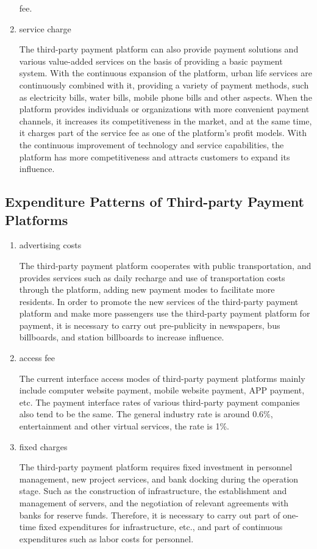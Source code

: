 \documentclass[../mcmpaper]{subfiles}
\begin{document}
\begin{enumerate}[label=\arabic*), itemindent=2\parindent, leftmargin=0pt, topsep=0pt, listparindent=\parindent, itemsep=1pt]
fee.
	\item service charge\par
The third-party payment platform can also provide payment solutions and various value-added services on the basis of providing a basic payment system. With the continuous expansion of the platform, urban life services are continuously combined with it, providing a variety of payment methods, such as electricity bills, water bills, mobile phone bills and other aspects. When the platform provides individuals or organizations with more convenient payment channels, it increases its competitiveness in the market, and at the same time, it charges part of the service fee as one of the platform's profit models. With the continuous improvement of technology and service capabilities, the platform has more competitiveness and attracts customers to expand its influence.
\end{enumerate}
\subsection{Expenditure Patterns of Third-party Payment Platforms}
\begin{enumerate}[label=\arabic*), itemindent=2\parindent, leftmargin=0pt, topsep=0pt, listparindent=\parindent, itemsep=1pt]
    \item advertising costs\par
The third-party payment platform cooperates with public transportation, and provides services such as daily recharge and use of transportation costs through the platform, adding new payment modes to facilitate more residents. In order to promote the new services of the third-party payment platform and make more passengers use the third-party payment platform for payment, it is necessary to carry out pre-publicity in newspapers, bus billboards, and station billboards to increase influence.
    \item access fee\par
The current interface access modes of third-party payment platforms mainly include computer website payment, mobile website payment, APP payment, etc. The payment interface rates of various third-party payment companies also tend to be the same. The general industry rate is around 0.6\%, entertainment and other virtual services, the rate is 1\%.
    \item fixed charges\par
The third-party payment platform requires fixed investment in personnel management, new project services, and bank docking during the operation stage. Such as the construction of infrastructure, the establishment and management of servers, and the negotiation of relevant agreements with banks for reserve funds. Therefore, it is necessary to carry out part of one-time fixed expenditures for infrastructure, etc., and part of continuous expenditures such as labor costs for personnel.
\end{enumerate}
\end{document}
